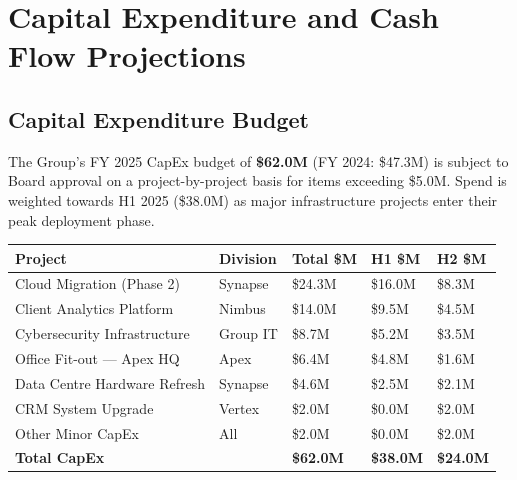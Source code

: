 
\section{Capital Expenditure and Cash Flow Projections}

\subsection{Capital Expenditure Budget}

The Group's FY 2025 CapEx budget of \textbf{\$62.0M} (FY 2024: \$47.3M) is subject
to Board approval on a project-by-project basis for items exceeding \$5.0M. Spend
is weighted towards H1 2025 (\$38.0M) as major infrastructure projects enter their
peak deployment phase.

\vspace{4pt}
\begin{center}
\renewcommand{\arraystretch}{1.38}
\begin{tabular}{L{5.2cm} C{1.8cm} R{1.8cm} R{1.8cm} R{1.9cm}}
  \toprule
  \color{white}\textbf{Project} &
  \color{white}\textbf{Division} &
  \color{white}\textbf{Total \$M} &
  \color{white}\textbf{H1 \$M} &
  \color{white}\textbf{H2 \$M} \\
  \midrule
  Cloud Migration (Phase 2)              & Synapse  & \$24.3M & \$16.0M & \$8.3M \\
  Client Analytics Platform              & Nimbus   & \$14.0M & \$9.5M  & \$4.5M \\
  Cybersecurity Infrastructure           & Group IT & \$8.7M  & \$5.2M  & \$3.5M \\
  Office Fit-out — Apex HQ               & Apex     & \$6.4M  & \$4.8M  & \$1.6M \\
  Data Centre Hardware Refresh           & Synapse  & \$4.6M  & \$2.5M  & \$2.1M \\
  CRM System Upgrade                     & Vertex   & \$2.0M  & \$0.0M  & \$2.0M \\
  Other Minor CapEx                      & All      & \$2.0M  & \$0.0M  & \$2.0M \\
  \midrule
  \textbf{Total CapEx}                   &          & \textbf{\$62.0M} & \textbf{\$38.0M} & \textbf{\$24.0M} \\
  \bottomrule
\end{tabular}
\end{center}


